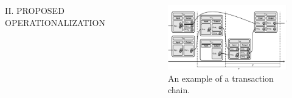 \documentclass[final,hyperref={pdfpagelabels=false}]{beamer}
\begin{document}
\begin{frame}[t]
\begin{columns}
\begin{column}{.9\textwidth}
\begin{columns}[T]


{\Large II. PROPOSED OPERATIONALIZATION}\vspace{-1ex}
\textcolor{hublau}{\rule{\textwidth}{4pt}}\\[1ex]


  


  \begin{figure}
    \centering
    \includegraphics[width=01\columnwidth]{fig/tx_chain}
    \caption{An example of a transaction chain.}
    \label{fig:unilogo}
  \end{figure}
  

\end{columns}
\end{column}
\end{columns}
\end{frame}
\end{document}
